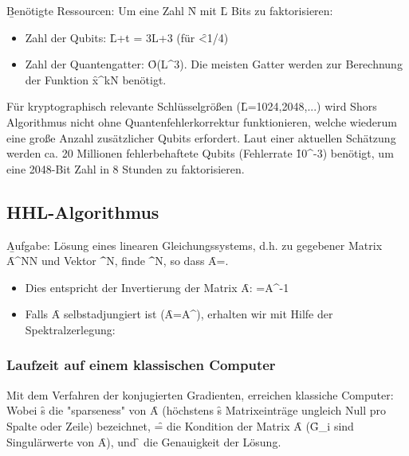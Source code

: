 \b{Benötigte Ressourcen:} Um eine Zahl \f{N} mit \f{L} Bits zu faktorisieren:
\begin{itemize}
    \item Zahl der Qubits: \f{L+t = 3L+3} (für \f{\epsilon<1/4})
    \item Zahl der Quantengatter: \f{O(L^3)}. Die meisten Gatter werden zur Berechnung der Funktion \f{x^k\mod N} benötigt.
\end{itemize}

Für kryptographisch relevante Schlüsselgrößen (\f{L}=1024,2048,...) wird Shors Algorithmus nicht ohne Quantenfehlerkorrektur funktionieren, welche wiederum eine große Anzahl zusätzlicher Qubits erfordert. Laut einer aktuellen Schätzung werden ca. 20 Millionen fehlerbehaftete Qubits (Fehlerrate \f{10^{-3}}) benötigt, um eine 2048-Bit Zahl in 8 Stunden zu faktorisieren. 


\subsection{HHL-Algorithmus}
\b{Aufgabe:} Lösung eines linearen Gleichungssystems, d.h. zu gegebener Matrix \f{A\in{}^{N\times N}} und Vektor \f{\in{}^N}, finde \f{\in{}^N}, so dass \f{A=}.
\begin{itemize}
    \item Dies entspricht der Invertierung der Matrix \f{A: =A^{-1}}
    \item Falls \f{A} selbstadjungiert ist (\f{A=A^\dagger}), erhalten wir mit Hilfe der Spektralzerlegung:
\end{itemize}
\subsubsection{Laufzeit auf einem klassischen Computer}
Mit dem Verfahren der konjugierten Gradienten, erreichen klassiche Computer:
Wobei \f{s} die "sparseness" von \f{A} (höchstens \f{s} Matrixeinträge ungleich Null pro Spalte oder Zeile) bezeichnet, \f{\kappa=} die Kondition der Matrix \f{A} (\f{G_i} sind Singulärwerte von \f{A}), und \f{\epsilon} die Genauigkeit der Lösung.

